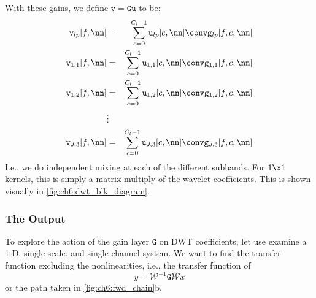 With these gains, we define $\mathtt{v}=\mathtt{Gu}$ to be:
\begin{eqnarray}
  \mathtt{v}_{lp}[f, \nn] &= & \sum_{c=0}^{C_l-1} \mathtt{u}_{lp}[c, \nn] \conv \mathtt{g}_{lp}[f, c, \nn] \\
  \mathtt{v}_{1,1}[f, \nn] &= & \sum_{c=0}^{C_l-1} \mathtt{u}_{1,1}[c, \nn] \conv \mathtt{g}_{1,1}[f, c, \nn] \\
  \mathtt{v}_{1,2}[f, \nn] &= & \sum_{c=0}^{C_l-1} \mathtt{u}_{1,2}[c, \nn] \conv \mathtt{g}_{1,2}[f, c, \nn] \\
                  & \vdots & \\
  \mathtt{v}_{J,3}[f, \nn] &= & \sum_{c=0}^{C_l-1} \mathtt{u}_{J,3}[c, \nn] \conv \mathtt{g}_{J,3}[f, c, \nn] 
\end{eqnarray}
%
I.e., we do independent mixing at each of the different subbands. For $1\x 1$
kernels, this is simply a matrix multiply of the wavelet coefficients. This is shown
visually in \autoref{fig:ch6:dwt_blk_diagram}.

\subsubsection{The Output}

\begin{figure}[ht!]
  \centering
  
  \label{fig:ch6:dwt_gain}
\end{figure}

To explore the action of the gain layer $\mathtt{G}$ on DWT coefficients, let
use examine a 1-D, single scale, and single channel system. We want to find the
transfer function excluding the nonlinearities, i.e., the transfer function of
\begin{equation}
y = \mathcal{W}^{-1}\mathtt{G}\mathcal{W}x
\end{equation}
or the path taken in \autoref{fig:ch6:fwd_chain}b. 

